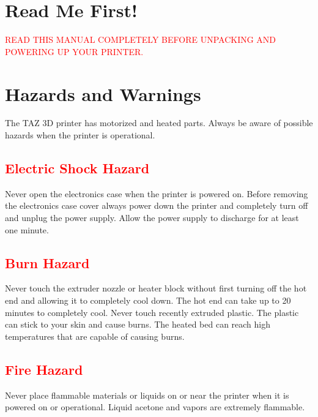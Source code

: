 %
%
%
%
%

\section{Read Me First!}
\textcolor{red}{READ THIS MANUAL COMPLETELY BEFORE UNPACKING AND POWERING UP YOUR PRINTER.}

\section{Hazards and Warnings}

The TAZ 3D printer has motorized and heated parts.  Always be aware of possible hazards when the printer is operational.

\subsection{\textcolor{red}{Electric Shock Hazard}}
Never open the electronics case when the printer is powered on. Before removing the electronics case cover always power down the printer and completely turn off and unplug the power supply. Allow the power supply to discharge for at least one minute.

\subsection{\textcolor{red}{Burn Hazard}}
Never touch the extruder nozzle or heater block without first turning off the hot end and allowing it to completely cool down. The hot end can take up to 20 minutes to completely cool. Never touch recently extruded plastic. The plastic can stick to your skin and cause burns. The heated bed can reach high temperatures that are capable of causing burns.

\subsection{\textcolor{red}{Fire Hazard}}
Never place flammable materials or liquids on or near the printer when it is powered on or operational. Liquid acetone and vapors are extremely flammable.

